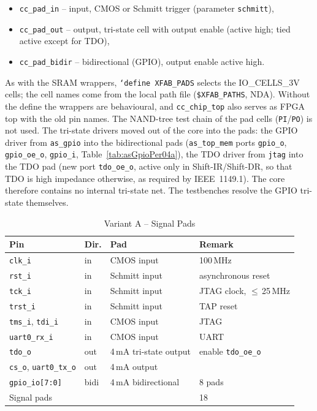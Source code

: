 \begin{itemize}
  \item \texttt{cc\_pad\_in} -- input, CMOS or Schmitt trigger
    (parameter \texttt{schmitt}),
  \item \texttt{cc\_pad\_out} -- output, tri-state cell with output enable
    (active high; tied active except for TDO),
  \item \texttt{cc\_pad\_bidir} -- bidirectional (GPIO), output enable
    active high.
\end{itemize}

As with the SRAM wrappers, \texttt{`define XFAB\_PADS} selects the
IO\_CELLS\_3V cells; the cell names come from the local path file
(\texttt{\$XFAB\_PATHS}, NDA). Without the define the wrappers are
behavioural, and \texttt{cc\_chip\_top} also serves as FPGA top with the old
pin names. The NAND-tree test chain of the pad cells (\texttt{PI}/\texttt{PO})
is not used.
The tri-state drivers moved out of the core into the pads: the GPIO driver
from \texttt{as\_gpio} into the bidirectional pads (\texttt{as\_top\_mem}
ports \texttt{gpio\_o}, \texttt{gpio\_oe\_o}, \texttt{gpio\_i},
Table~\ref{tab:asGpioPer04a}), the TDO driver from \texttt{jtag} into the
TDO pad (new port \texttt{tdo\_oe\_o}, active only in Shift-IR/Shift-DR, so
that TDO is high impedance otherwise, as required by IEEE~1149.1). The core therefore contains no internal tri-state
net. The testbenches resolve the GPIO tri-state themselves.

\begin{table}[H]
\caption{Variant A -- Signal Pads}
\label{tab:asPadsA}
\centering
\begin{tabularx}{\textwidth}{|l |l |l |X|}
  \hline
  Pin & Dir. & Pad & Remark \\
  \hline
  \hline
  \texttt{clk\_i}      & in  & CMOS input    & 100\,MHz \\
  \hline
  \texttt{rst\_i}      & in  & Schmitt input & asynchronous reset \\
  \hline
  \texttt{tck\_i}      & in  & Schmitt input & JTAG clock, $\le$\,25\,MHz \\
  \hline
  \texttt{trst\_i}     & in  & Schmitt input & TAP reset \\
  \hline
  \texttt{tms\_i}, \texttt{tdi\_i} & in & CMOS input & JTAG \\
  \hline
  \texttt{uart0\_rx\_i} & in & CMOS input    & UART \\
  \hline
  \texttt{tdo\_o}      & out & 4\,mA tri-state output & enable \texttt{tdo\_oe\_o} \\
  \hline
  \texttt{cs\_o}, \texttt{uart0\_tx\_o} & out & 4\,mA output & \\
  \hline
  \texttt{gpio\_io[7:0]} & bidi & 4\,mA bidirectional & 8 pads \\
  \hline
  \multicolumn{3}{|l|}{Signal pads} & 18 \\
  \hline
\end{tabularx}
\end{table}

